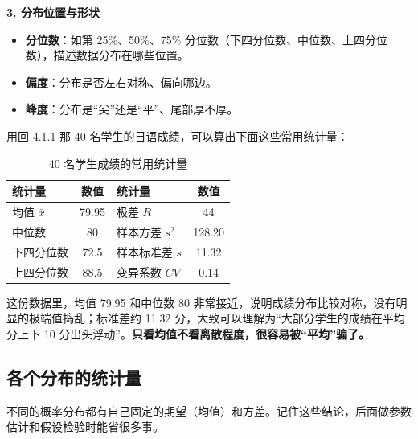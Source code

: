 \documentclass[lang=cn,10pt]{elegantbook}
\begin{document}
\textbf{3. 分布位置与形状}
\begin{itemize}
  \item \textbf{分位数}：如第 25\%、50\%、75\% 分位数（下四分位数、中位数、上四分位数），描述数据分布在哪些位置。
  \item \textbf{偏度}：分布是否左右对称、偏向哪边。
  \item \textbf{峰度}：分布是“尖”还是“平”、尾部厚不厚。
\end{itemize}

用回 4.1.1 那 40 名学生的日语成绩，可以算出下面这些常用统计量：
\begin{table}[H]
  \centering
  \caption{40 名学生成绩的常用统计量}
  \begin{tabular}{lc|lc}
    \toprule
    统计量 & 数值 & 统计量 & 数值 \\
    \midrule
    均值 $\bar{x}$ & 79.95 & 极差 $R$ & 44 \\
    中位数 & 80 & 样本方差 $s^2$ & 128.20 \\
    下四分位数 & 72.5 & 样本标准差 $s$ & 11.32 \\
    上四分位数 & 88.5 & 变异系数 $CV$ & 0.14 \\
    \bottomrule
  \end{tabular}
\end{table}

\begin{remark}
这份数据里，均值 79.95 和中位数 80 非常接近，说明成绩分布比较对称，没有明显的极端值捣乱；标准差约 11.32 分，大致可以理解为“大部分学生的成绩在平均分上下 10 分出头浮动”。\textbf{只看均值不看离散程度，很容易被“平均”骗了。}
\end{remark}

\subsection{各个分布的统计量}
不同的概率分布都有自己固定的期望（均值）和方差。记住这些结论，后面做参数估计和假设检验时能省很多事。
\end{document}
